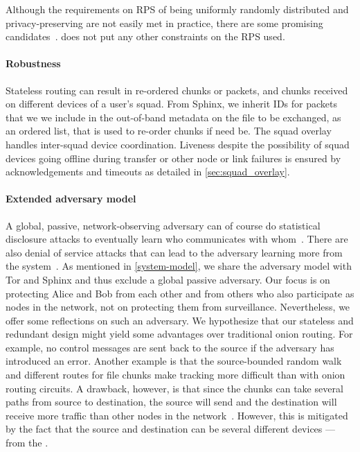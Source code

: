 Although the requirements on \ac{RPS} of being uniformly randomly
distributed and privacy-preserving are not easily met in practice,
there are some promising candidates~\cite{Octopus, BrahmsRPS}.\name
does not put any other constraints on the \ac{RPS} used.

\paragraph*{Robustness}

Stateless routing can result in re-ordered chunks or packets, and
chunks received on different devices of a user's squad. From Sphinx,
we inherit IDs for packets that we we include in the out-of-band
metadata on the file to be exchanged, as an ordered list, that is used
to re-order chunks if need be. The squad overlay handles inter-squad
device coordination. Liveness despite the possibility of squad devices
going offline during transfer or other node or link failures is
ensured by acknowledgements and timeouts as detailed in 
\cref{sec:squad_overlay}.


\paragraph*{Extended adversary model}%
\label{security-limitations}

A global, passive, network-observing adversary can of course do
statistical disclosure attacks to eventually learn who communicates
with whom~\cite{StatisticalDisclosureAttacks}.   There are also denial
of service attacks that can lead to the adversary learning more from
the system~\cite{DenialOfSecurity}.  As mentioned in
\cref{system-model}, we share the adversary model with Tor and Sphinx
and thus exclude a global passive adversary. Our focus is on
protecting Alice and Bob from each other and from others who also
participate as nodes in the network, not on protecting them from
surveillance. Nevertheless, we offer some reflections on such an
adversary. We hypothesize that our stateless and redundant design
might yield some advantages over traditional onion routing. For
example, no control messages are sent back to the source if the
adversary has introduced an error.     Another example is that the source-bounded
random walk and different routes for file chunks make tracking more
difficult than with onion routing circuits. A drawback, however, is
that since the chunks can take several paths from source to destination, the source 
will send and the destination will receive more traffic than other nodes in the 
network~\cite{RoutingSurveyAnonymousProtocols}. However, this is mitigated by the fact that the source and 
destination can be several different devices --- \ie from the \squads.


